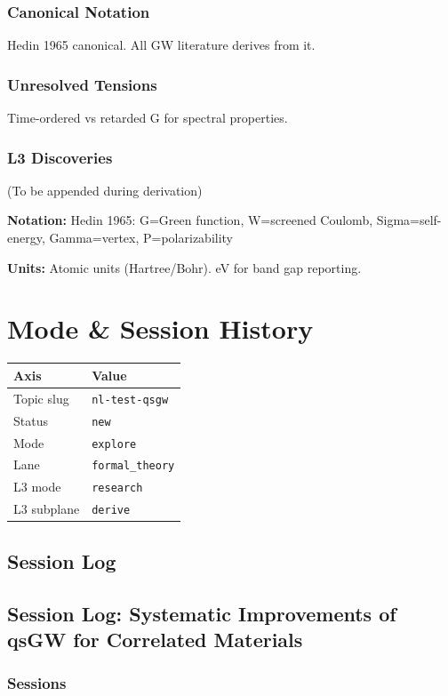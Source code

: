 \documentclass[11pt,a4paper]{article}
\begin{document}
\subsubsection*{Canonical Notation}
Hedin 1965 canonical. All GW literature derives from it.

\subsubsection*{Unresolved Tensions}
Time-ordered vs retarded G for spectral properties.

\subsubsection*{L3 Discoveries}
(To be appended during derivation)



\noindent\textbf{Notation:} Hedin 1965: G=Green function, W=screened Coulomb, Sigma=self-energy, Gamma=vertex, P=polarizability

\noindent\textbf{Units:} Atomic units (Hartree/Bohr). eV for band gap reporting.

\section{Mode \& Session History}

\noindent
\begin{tabular}{ll}
\toprule
\textbf{Axis} & \textbf{Value} \\
\midrule
Topic slug & \texttt{nl-test-qsgw} \\
Status & \texttt{new} \\
Mode & \texttt{explore} \\
Lane & \texttt{formal\_theory} \\
L3 mode & \texttt{research} \\
L3 subplane & \texttt{derive} \\
\bottomrule
\end{tabular}

\subsection*{Session Log}
\subsection*{Session Log: Systematic Improvements of qsGW for Correlated Materials}

\subsubsection*{Sessions}
\end{document}
